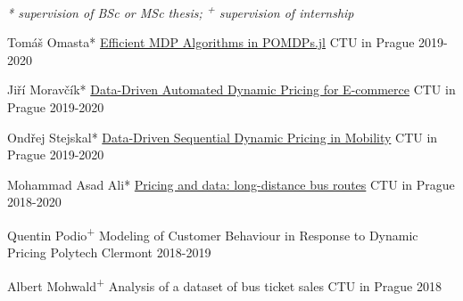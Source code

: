 
\vspace{-0.3cm}
\begin{small}\textit{* supervision of BSc or MSc thesis; \textsuperscript{+} supervision of internship}\end{small}


\begin{cvhonors}
  \cvhonor
    {Tomáš Omasta*} %
    {\href{https://dspace.cvut.cz/handle/10467/94418?locale-attribute=en}{Efficient MDP Algorithms in POMDPs.jl}} %
    {CTU in Prague} %
    {2019-2020} %

  \cvhonor
    {Jiří Moravčík*} %
    {\href{https://dspace.cvut.cz/handle/10467/94420?locale-attribute=en}{Data-Driven Automated Dynamic Pricing for E-commerce}} %
    {CTU in Prague} %
    {2019-2020} %

  \cvhonor
    {Ondřej Stejskal*} %
    {\href{https://dspace.cvut.cz/handle/10467/94413?locale-attribute=en}{Data-Driven Sequential Dynamic Pricing in Mobility}} %
    {CTU in Prague} %
    {2019-2020} %

  \cvhonor
    {Mohammad Asad Ali*} %
    {\href{https://dspace.cvut.cz/handle/10467/87780?locale-attribute=en}{Pricing and data: long-distance bus routes}} %
    {CTU in Prague} %
    {2018-2020} %

  \cvhonor
    {Quentin Podio\textsuperscript{+}} %
    {Modeling of Customer Behaviour in Response to Dynamic Pricing} %
    {\hspace{-3em}Polytech Clermont} %
    {2018-2019} %

  \cvhonor
    {Albert Mohwald\textsuperscript{+}} %
    {Analysis of a dataset of bus ticket sales} %
    {CTU in Prague} %
    {2018} %

\end{cvhonors}
